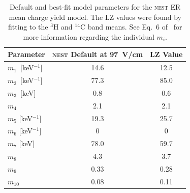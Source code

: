 \begin{table}[h!]
    \centering
    \caption{Default and best-fit model parameters for the \textsc{nest} ER mean charge yield model. The LZ values were found by fitting to the $^3$H and $^{14}$C band means. See Eq.~6 of~\cite{szydagis2022review} for more information regarding the individual $m_i$. \\}
    \begin{tabular}{l c c}
    \hline
    \hline
    Parameter & \textsc{nest} Default at 97~V/cm & LZ Value \\
    \hline
    $m_1$~[keV$^{-1}$] & 14.6 & 12.5 \\
    $m_2$~[keV$^{-1}$] & 77.3 & 85.0 \\
    $m_3$~[keV] & 0.8 & 0.6 \\
    $m_4$ & 2.1 & 2.1 \\
    $m_5$ [keV$^{-1}$] & 19.3 & 25.7 \\
    $m_6$ [keV$^{-1}$] & 0 & 0 \\
    $m_7$ [keV] & 78.0 &  59.7 \\
    $m_8$ & 4.3 & 3.7 \\
    $m_9$ & 0.33 & 0.28 \\
    $m_{10}$ & 0.08 & 0.11 \\
    \hline
    \hline
    \end{tabular}
    
    \label{nest_ER_params}
\end{table}



